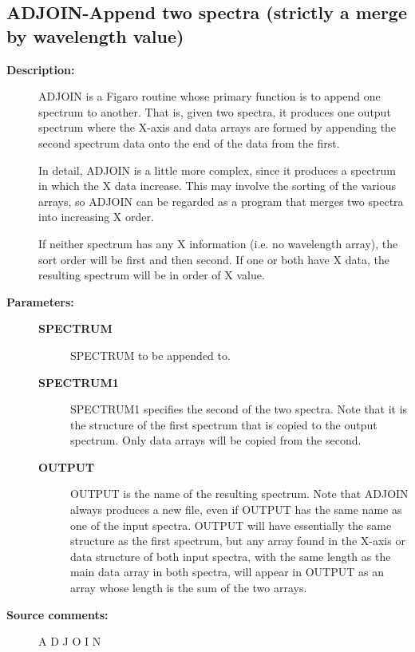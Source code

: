 \subsection{ADJOIN-\label{ADJOIN}Append two spectra (strictly a merge by wavelength value)}
\begin{description}

\item [\textbf{Description:}]
 ADJOIN is a Figaro routine whose primary function is to append one
 spectrum to another.  That is, given two spectra, it produces one
 output spectrum where the X-axis and data arrays are formed by
 appending the second spectrum data onto the end of the data from the
 first.

 In detail, ADJOIN is a little more complex, since it produces a
 spectrum in which the X data increase.  This may involve the sorting
 of the various arrays, so ADJOIN can be regarded as a program that
 merges two spectra into increasing X order.

 If neither spectrum has any X information (i.e. no wavelength array),
 the sort order will be first and then second.  If one or both have
 X data, the resulting spectrum will be in order of X value.

\item [\textbf{Parameters:}]
\begin{description}
\item [\textbf{SPECTRUM}]
 SPECTRUM to be appended to.
\item [\textbf{SPECTRUM1}]
 SPECTRUM1 specifies the second of the two spectra.
 Note that it is the structure of the first spectrum
 that is copied to the output spectrum.  Only data
 arrays will be copied from the second.
\item [\textbf{OUTPUT}]
 OUTPUT is the name of the resulting spectrum.  Note
 that ADJOIN always produces a new file, even if OUTPUT
 has the same name as one of the input spectra.  OUTPUT
 will have essentially the same structure as the first
 spectrum, but any array found in the X-axis or data
 structure of both input spectra, with the same length
 as the main data array in both spectra, will appear in
 OUTPUT as an array whose length is the sum of the two
 arrays.
\end{description}

\item [\textbf{Source comments:}]
\begin{terminalv}
 A D J O I N


\end{terminalv}
\end{description}
